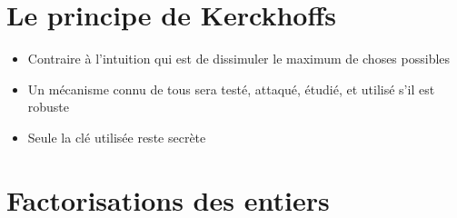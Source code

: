 \section{Le principe de Kerckhoffs}

\begin{frame}



\pause


\pause


\pause

\begin{itemize}
  \item Contraire à l'intuition qui est de dissimuler le maximum de choses possibles
\pause
  \item Un mécanisme connu de tous sera testé, attaqué, étudié, 
et utilisé s'il est robuste
\pause
  \item Seule la clé utilisée reste secrète
  
\end{itemize}

\end{frame}



\section{Factorisations des entiers}

